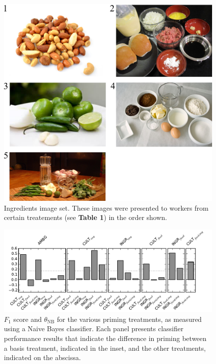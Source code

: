 \documentclass[a4paper]{report}
\begin{document}
\begin{figure}
	\includegraphics[scale=1.00]{figs/taskImages/ingredients.png}
	\caption{ Ingredients image set. These images were presented to workers 
		from certain treatements (see \textbf{Table 1}) in the order shown.}
\end{figure}

\begin{figure}
	\includegraphics{figs/f1-thetas_full_pairwise50_img1.pdf}
	\caption{ $F_1$ score and $\theta_\text{NB}$ for the various 
priming treatments, as measured using a Naive Bayes classifier. Each panel 
presents classifier performance results that indicate the difference in
priming between a basis 
treatment, indicated in the inset, and the other treatments, indicated on the
abscissa. }
\end{figure}
\end{document}
